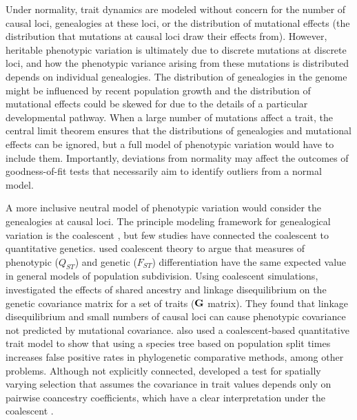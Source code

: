 Under normality, trait dynamics are modeled without concern for the number of
causal loci, genealogies at these loci, or the distribution of mutational
effects (the distribution that mutations at causal loci draw their effects
from). However, heritable phenotypic variation is ultimately due to discrete
mutations at discrete loci, and how the phenotypic variance arising from these
mutations is distributed depends on individual genealogies. The distribution of
genealogies in the genome might be influenced by recent population growth and
the distribution of mutational effects could be skewed for due to the details of
a particular developmental pathway. When a large number of mutations affect a
trait, the central limit theorem ensures that the distributions of genealogies
and mutational effects can be ignored, but a full model of phenotypic variation
would have to include them. Importantly, deviations from normality may affect
the outcomes of goodness-of-fit tests that necessarily aim to identify outliers
from a normal model.

A more inclusive neutral model of phenotypic variation would consider the
genealogies at causal loci. The principle modeling framework for genealogical
variation is the coalescent \citep{Wakeley2008}, but few studies have connected
the coalescent to quantitative genetics. \citet{Whitlock1999} used coalescent
theory to argue that measures of phenotypic ($Q_{ST}$) and genetic ($F_{ST}$)
differentiation have the same expected value in general models of population
subdivision. Using coalescent simulations, \citet{Griswold2007} investigated the
effects of shared ancestry and linkage disequilibrium on the genetic covariance
matrix for a set of traits ($\mbox{\textbf{G}}$ matrix). They found that linkage
disequilibrium and small numbers of causal loci can cause phenotypic covariance
not predicted by mutational covariance. \citet{Mendes2018} also used a
coalescent-based quantitative trait model to show that using a species tree
based on population split times increases false positive rates in phylogenetic
comparative methods, among other problems. Although not explicitly
connected, \citet{Ovaskainen2011} developed a test for spatially varying
selection that assumes the covariance in trait values depends only on pairwise
coancestry coefficients, which have a clear interpretation under the
coalescent \citep{Slatkin1991}.

